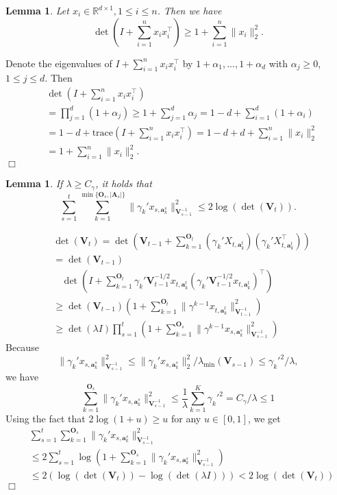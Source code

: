 \documentclass{article}
\newcommand{\RR}{\mathbb{R}}
\newcommand{\bA}{\mathbf{A}}
\newcommand{\ba}{\mathbf{a}}
\newcommand{\bO}{\mathbf{O}}
\newcommand{\bV}{\mathbf{V}}
\newcommand{\trace}{\mathrm{trace}}
\newcommand{\abs}[1]{\left| #1 \right|}
\newcommand{\norm}[1]{\| #1 \|}
\newtheorem{lemma}[theorem]{Lemma}%
\newenvironment{proof}{\noindent {\textbf{Proof. }}}{$\Box$ \medskip}
\begin{document}
\begin{lemma} %
Let $x_i \in \RR^{d \times 1}, 1 \leq i \leq n$. Then we have
$$
\det(I + \sum_{i=1}^n x_i x_i^{\top}) \geq 1 + \sum_{i=1}^n \norm{x_i}_2^2.
$$
\end{lemma}
\begin{proof}
Denote the eigenvalues of $I + \sum_{i=1}^n x_i x_i^{\top}$ by $1+\alpha_1,...,1+\alpha_d$ with $\alpha_j \geq 0$, $1\leq j\leq d$. Then
\begin{align*}
&\det(I + \sum_{i=1}^n x_i x_i^{\top})\\
&= \prod_{j=1}^d (1 + \alpha_j)\geq 1 +\sum_{j=1}^d \alpha_j =1-d + \sum_{i=1}^d (1+\alpha_i) \\
&=1-d + \trace(I + \sum_{i=1}^n x_i x_i^{\top})= 1-d + d + \sum_{i=1}^n \norm{x_i}_2^2\\
&=1 + \sum_{i=1}^n \norm{x_i}_2^2.
\end{align*}
\end{proof}

\begin{lemma}
If $\lambda \geq C_\gamma$, it holds that
$$
\sum_{s=1}^t \sum_{k=1}^{\min\{\bO_s, \abs{\bA_s}\}} \norm{\gamma_k' x_{s,\ba_{k}^s}}_{\bV_{s-1}^{-1}}^2 \leq 2\log(\det(\bV_t)).
$$
\end{lemma}
\begin{proof}
\begin{align*}
&\det(\bV_t) = \det(\bV_{t-1} + \sum_{k=1}^{\bO_t} (\gamma_k' X_{t,\ba_k^{t}})(\gamma_k' X_{t, \ba_k^{t}}^{\top}))\\
&=\det(\bV_{t-1})\\
&~~~~\det(I + \sum_{k=1}^{\bO_t} \gamma_k'\bV_{t-1}^{-1/2}x_{t,\ba_{k}^{t}} (\gamma_k' \bV_{t-1}^{-1/2}x_{t,\ba_{k}^{t}})^{\top})\\
&\geq \det(\bV_{t-1}) (1 + \sum_{k=1}^{\bO_t} \norm{\gamma^{k-1}x_{t,\ba_k^t}}_{\bV_{t-1}^{-1}}^2)\\
&\geq \det(\lambda I)\prod_{s=1}^{t}(1 + \sum_{k=1}^{\bO_s} \norm{\gamma^{k-1}x_{s,\ba_k^s}}_{\bV_{s-1}^{-1}}^2)
\end{align*}
Because
$$
\norm{\gamma_k' x_{s,\ba_k^s}}_{\bV_{s-1}^{-1}}^2 \leq \norm{\gamma_k' x_{s,\ba_k^s}}_2^2/\lambda_{\min}(\bV_{s-1}) \leq \gamma_k'^2 /\lambda,
$$
we have 
$$
\sum_{k=1}^{\bO_s} \norm{\gamma_k' x_{s,\ba_k^s}}_{\bV_{s-1}^{-1}}^2 \leq \frac{1}{\lambda} \sum_{k=1}^{K} \gamma_k'^2 = C_\gamma /\lambda \leq 1
$$
Using the fact that $ 2\log(1+u) \geq u$ for any $u \in [0,1]$, we get
\begin{align*}
&\sum_{s=1}^t \sum_{k=1}^{\bO_s}\norm{\gamma_k' x_{s,\ba_{k}^s}}_{\bV_{s-1}^{-1}}^2 \\
&\leq 2\sum_{s=1}^t\log(1 + \sum_{k=1}^{\bO_s} \norm{\gamma_k' x_{s,\ba_k^s}}_{\bV_{s-1}^{-1}}^2)\\
&\leq 2(\log(\det(\bV_t)) - \log(\det(\lambda I))) < 2\log(\det(\bV_t))
\end{align*}
\end{proof}
	
	
	


	
\end{document}
